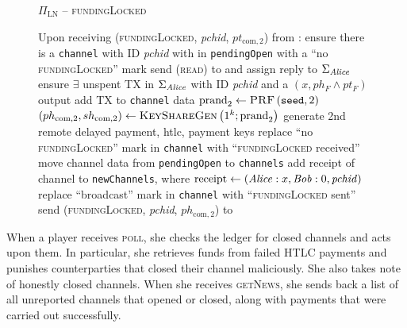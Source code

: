   \begin{figure}[H]
    \begin{protocolbox}{$\Pi_{\mathrm{LN}}$ -- \textsc{fundingLocked}}
      \begin{algorithmic}[1]
        \State Upon receiving (\textsc{fundingLocked}, \textit{pchid},
        $pt_{\mathrm{com}, 2}$) from \bob:
        \Indent
          \State ensure there is a \texttt{channel} with ID \textit{pchid} with
          \bob{} in \texttt{pendingOpen} with a ``no \textsc{fundingLocked}''
          mark
           
            \State send (\textsc{read}) to \ledger{} and assign reply to
            $\Sigma_{\mathit{Alice}}$
            \State ensure $\exists$ unspent TX in $\Sigma_{\mathit{Alice}}$ with ID
            \textit{pchid} and a $\left(x, ph_F \wedge pt_F\right)$ output
            \State add TX to \texttt{channel} data
            \State $\mathrm{prand}_2 \gets \textsc{PRF}\left(\mathtt{seed},
            2\right)$
            \label{alg:protocol:fundingLocked:prand}
            \State $\left(ph_{\mathrm{com}, 2}, sh_{\mathrm{com}, 2}\right) \gets
            \textsc{KeyShareGen}\left(1^k; \mathrm{prand}_2\right)$
            \State generate 2nd remote delayed payment, htlc, payment keys
          \EndIf
          \State replace ``no \textsc{fundingLocked}'' mark in \texttt{channel}
          with ``\textsc{fundingLocked} received''
          \State move channel data from \texttt{pendingOpen} to
          \texttt{channels}
          \State add receipt of channel to \texttt{newChannels}, where
          $\mathrm{receipt} \gets (\mathit{Alice}: x, \mathit{Bob}: 0, \mathit{pchid})$
          \label{alg:protocol:fundingLocked:report}
            \State replace ``broadcast'' mark in \texttt{channel} with
            ``\textsc{fundingLocked} sent''
            \State send (\textsc{fundingLocked}, \textit{pchid},
            $ph_{\mathrm{com}, 2}$) to \bob{}
          \EndIf
        \EndIndent
      \end{algorithmic}
    \end{protocolbox}
    \caption{}
    \label{alg:protocol:fundingLocked}
  \end{figure}

  When a player receives \textsc{poll}, she checks the ledger for closed
  channels and acts upon them. In particular, she retrieves funds from failed
  HTLC payments and punishes counterparties that closed their channel
  maliciously. She also takes note of honestly closed channels. When she
  receives \textsc{getNews}, she sends back a list of all unreported channels
  that opened or closed, along with payments that were carried out successfully.

